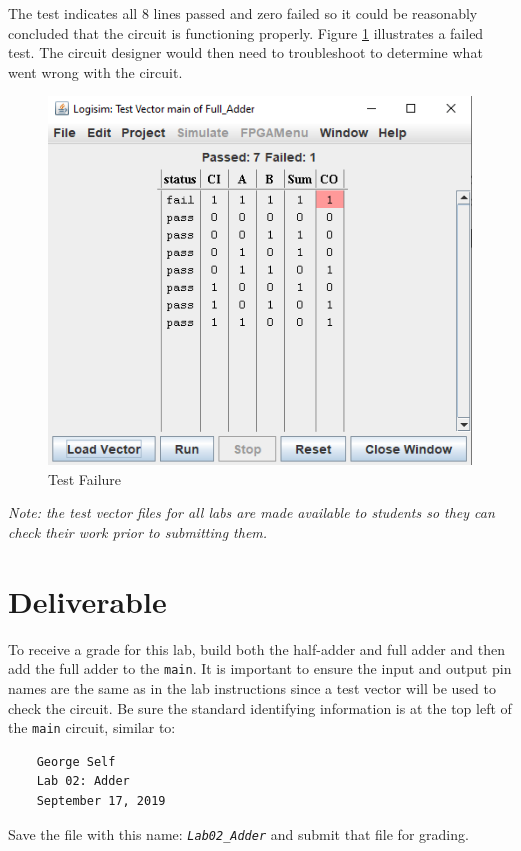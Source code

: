 The test indicates all 8 lines passed and zero failed so it could be reasonably concluded that the circuit is functioning properly. Figure \ref{fig:add-06} illustrates a failed test. The circuit designer would then need to troubleshoot to determine what went wrong with the circuit.

\begin{figure}[H]
	\centering
	\includegraphics[width=\maxwidth{.95\linewidth}]{gfx/add-06}
	\caption{Test Failure}
	\label{fig:add-06}
\end{figure}

\textit{Note: the test vector files for all labs are made available to students so they can check their work prior to submitting them.}

\section{Deliverable}

To receive a grade for this lab, build both the half-adder and full adder and then add the full adder to the \lstinline[columns=fixed]|main|. It is important to ensure the input and output pin names are the same as in the lab instructions since a test vector will be used to check the circuit. Be sure the standard identifying information is at the top left of the \lstinline[columns=fixed]|main| circuit, similar to: 

\bigskip
\begin{minipage}{\linewidth}
	\begin{verbatim}
	George Self
	Lab 02: Adder
	September 17, 2019
	\end{verbatim}
\end{minipage}
\bigskip

Save the file with this name: \emph{\texttt{Lab02\_Adder}} and submit that file for grading.

